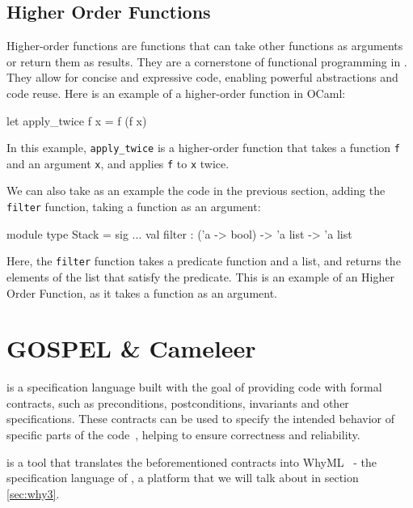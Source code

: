 \subsection{Higher Order Functions}
\label{sub:higher_order_functions}

Higher-order functions are functions that can take other functions as arguments 
or return them as results. They are a cornerstone of functional programming in \ocaml.
They allow 
for concise and expressive code, enabling powerful abstractions and code reuse. 
Here is an example of a higher-order function in OCaml:

\begin{ocamlenv}
    let apply_twice f x = f (f x)
\end{ocamlenv}

In this example, \texttt{apply\_twice} is a higher-order function that takes a function 
\texttt{f} and an argument \texttt{x}, and applies \texttt{f} to \texttt{x} twice.

We can also take as an example the code in the previous section, adding the \texttt{filter} 
function, taking a function as an argument:

\begin{ocamlenv}
    module type Stack = sig
        ...
        val filter : ('a -> bool) -> 'a list -> 'a list
\end{ocamlenv}

Here, the \texttt{filter} function takes a predicate function and a list, and returns 
the elements of the list that satisfy the predicate. This is an example of an Higher Order 
Function, as it takes a function as an argument.

\section{GOSPEL \& Cameleer}
\label{sec:gospel_and_cameleer}

\gospellang is a specification language built with the goal of providing \ocaml code 
with formal contracts, such as preconditions, postconditions, invariants and other 
specifications. These contracts can be used to specify the intended behavior of 
specific parts of the code~\cite{Soares_Chirica_Pereira2024}, helping to ensure correctness and reliability.

\cameleer is a tool that translates the beforementioned contracts into WhyML~\cite{Pereira_Ravara2021} - 
the specification language of \why, a platform that we will talk about in 
section \ref{sec:why3}.

